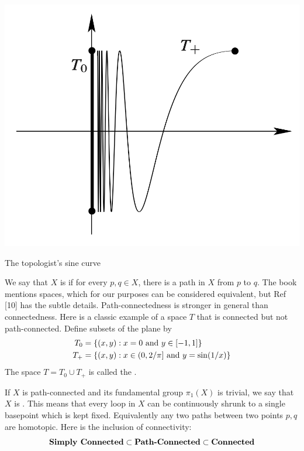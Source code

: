 \documentclass[10pt]{article}
\begin{document}
\begin{marginfigure}
	\hspace*{-10px}\includegraphics[width=1.3\textwidth]{figs/top_sine.png}
	\caption{The topologist's sine curve}
\end{marginfigure}
\begin{definition}
	We say that $X$ is  if for every $p,q \in X$, there is a path in $X$ from $p$ to $q$. 
	The book mentions  spaces, which for our purposes can be considered equivalent, but Ref [10] has the subtle details. Path-connectedness is stronger in general than connectedness. Here is a classic example of a space $T$ that is connected but not path-connected. Define subsets of the plane by
	$$
	\begin{aligned}
		T_0 &= \lbrace(x,y):x=0 \text{ and } y\in[-1,1]\rbrace\\
		T_+ &= \lbrace(x,y):x\in(0,2/\pi] \text{ and } y=\sin (1/x)\rbrace
	\end{aligned}
	$$
	The space $T=T_0\cup T_+$ is called the .
\end{definition}

\begin{definition}
	If $X$ is path-connected and its fundamental group $\pi_1(X)$ is trivial, we say that $X$ is . This means that every loop in $X$ can be continuously shrunk to a single basepoint which is kept fixed. Equivalently any two paths between two points $p, q$ are homotopic. Here is the inclusion of connectivity:
	$$
	\textbf{Simply Connected} \subset \textbf{Path-Connected} \subset \textbf{Connected}
 	$$
\end{definition}
\end{document}
